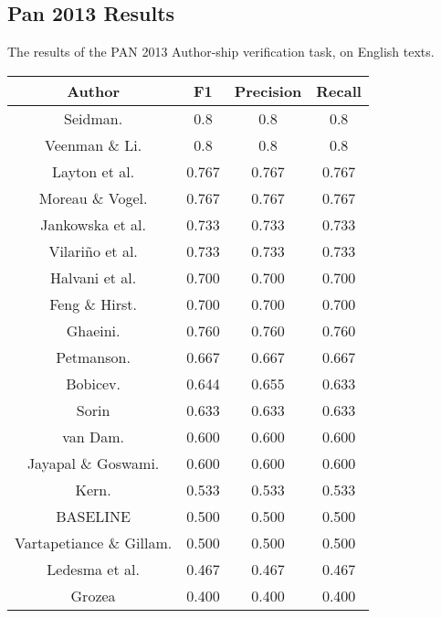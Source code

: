 \subsection{Pan 2013 Results}
\label{subsec:pan2013res}
The results of the PAN 2013 Author-ship verification task, on English texts.

\begin{center}
\begin{tabular}{|c|c|c|c|}
\hline
\textbf{Author}          & \textbf{F1} & \textbf{Precision} & \textbf{Recall} \\ \hline
Seidman.                 & 0.8         & 0.8                & 0.8             \\ \hline
Veenman \& Li.           & 0.8         & 0.8                & 0.8             \\ \hline
Layton et al.            & 0.767       & 0.767              & 0.767           \\ \hline
Moreau \& Vogel.         & 0.767       & 0.767              & 0.767           \\ \hline
Jankowska et al.         & 0.733       & 0.733              & 0.733           \\ \hline
Vilariño et al.          & 0.733       & 0.733              & 0.733           \\ \hline
Halvani et al.           & 0.700       & 0.700              & 0.700           \\ \hline
Feng \& Hirst.           & 0.700       & 0.700              & 0.700           \\ \hline
Ghaeini.                 & 0.760       & 0.760              & 0.760           \\ \hline
Petmanson.               & 0.667       & 0.667              & 0.667           \\ \hline
Bobicev.                 & 0.644       & 0.655              & 0.633           \\ \hline
Sorin                    & 0.633       & 0.633              & 0.633           \\ \hline
van Dam.                 & 0.600       & 0.600              & 0.600           \\ \hline
Jayapal \& Goswami.      & 0.600       & 0.600              & 0.600           \\ \hline
Kern.                    & 0.533       & 0.533              & 0.533           \\ \hline
BASELINE                 & 0.500       & 0.500              & 0.500           \\ \hline
Vartapetiance \& Gillam. & 0.500       & 0.500              & 0.500           \\ \hline
Ledesma et al.           & 0.467       & 0.467              & 0.467           \\ \hline
Grozea                   & 0.400       & 0.400              & 0.400           \\ \hline
\end{tabular}
\end{center}


